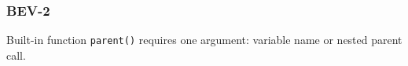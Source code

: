 \subsubsection{BEV-2}\label{sec:error_code_bev_2}

Built-in function \texttt{parent()} requires one argument: variable name or nested parent call.


